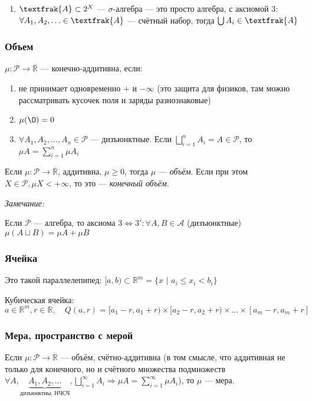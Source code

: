 \documentclass{article}
\def\dbl{\,\,}
\begin{document}
\begin{enumerate}
    \item $\textfrak{A} \subset 2^X$ --- $\sigma$-алгебра --- это просто алгебра, с аксиомой 3: $\forall A_1, A_2, \ldots \in \textfrak{A}$ --- счётный набор, тогда $\bigcup A_i \in \textfrak{A}$
\end{enumerate}

\subsubsection{Объем}

$\mu: \mathcal{P} \rightarrow \overline{\mathbb{R}}$ --- конечно-аддитивна, если: 

\begin{enumerate}
    \item не принимает одновременно $+$ и $- \infty$ (это защита для физиков, там можно рассматривать кусочек поля и заряды разнознаковые)
    \item $\mu(\O) = 0$
    \item $\forall  A_1, A_2, \ldots, A_{n} \in \mathcal{P}$ --- дизъюнктные. Если $\bigsqcup_{i = 1}^{n} A_i = A \in \mathcal{P}$, то $\mu A = \sum_{i = 1}^{n} \mu A_i$
\end{enumerate}

Если $\mu: \mathcal{P} \rightarrow \overline{\mathbb{R}}$, аддитивна, $\mu \ge 0$, тогда $\mu$ --- \textit{объём}. Если при этом $X \in \mathcal{P}, \mu X < + \infty$, то это --- \textit{конечный объём}.

\textit{Замечание:}

Если $\mathcal{P}$ --- алгебра, то аксиома $3 \Leftrightarrow 3': \forall A, B \in \mathcal{A}$ (дизъюнктные) $\mu (A \sqcup B) = \mu A + \mu B$

\subsubsection{Ячейка}

Это такой параллелепипед: $[a, b) \subset \mathbb{R}^m = \{x \dbl | \dbl a_i \le x_i < b_i\}$

Кубическая ячейка: $a \in \mathbb{R}^m, r \in \mathbb{R}, \quad Q(a, r) = [a_1 - r, a_1 + r) \times [a_2 - r, a_2 + r) \times \ldots \times [a_m - r, a_m + r]$

\subsubsection{Мера, пространство с мерой}

Если $\mu: \mathcal{P} \rightarrow \overline{\mathbb{R}}$ --- объём, счётно-аддитивна (в том смысле, что аддитивная не только для конечного, но и счётного множества подмножеств $\forall A, \underbrace{A_1, A_2, \ldots}_{\text{дизъюнктны, НЧСЧ}}, \bigsqcup_{i = 1}^{\infty} A_i \Rightarrow \mu A = \sum_{i = 1}^{\infty} \mu A_i$), то $\mu$ --- мера.
\end{document}
